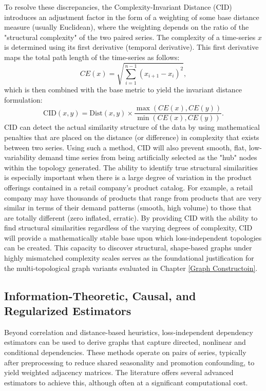 To resolve these discrepancies, the Complexity-Invariant Distance (CID) \cite{batista_cid_2014} introduces an adjustment factor in the form of a weighting of some base distance measure (usually Euclidean), where the weighting depends on the ratio of the "structural complexity" of the two paired series. The complexity of a time-series \( x \) is determined using its first derivative (temporal derivative). This first derivative maps the total path length of the time-series as follows:
\begin{equation}
    CE(x) = \sqrt{\sum_{i=1}^{n-1} (x_{i+1} - x_i)^2},
\end{equation}
which is then combined with the base metric to yield the invariant distance formulation:
\begin{equation}
    \text{CID}(x, y) = \text{Dist}(x, y) \times \frac{\max(CE(x), CE(y))}{\min(CE(x), CE(y))}.
\end{equation}
CID can detect the actual similarity structure of the data by using mathematical penalties that are placed on the distance (or difference) in complexity that exists between two series. Using such a method, CID will also prevent smooth, flat, low-variability demand time series from being artificially selected as the "hub" nodes within the topology generated. The ability to identify true structural similarities is especially important when there is a large degree of variation in the product offerings contained in a retail company's product catalog. For example, a retail company may have thousands of products that range from products that are very similar in terms of their demand patterns (smooth, high volume) to those that are totally different (zero inflated, erratic). By providing CID with the ability to find structural similarities regardless of the varying degrees of complexity, CID will provide a mathematically stable base upon which loss-independent topologies can be created. This capacity to discover structural, shape-based graphs under highly mismatched complexity scales serves as the foundational justification for the multi-topological graph variants evaluated in Chapter \ref{Graph Constructoin}.
\subsection{Information-Theoretic, Causal, and Regularized Estimators}
\label{subsec:info_causal_regularized_estimators}

Beyond correlation and distance-based heuristics, loss-independent dependency estimators can be used to derive graphs that capture directed, nonlinear and conditional dependencies. These methods operate on pairs of series, typically after preprocessing to reduce shared seasonality and promotion confounding, to yield weighted adjacency matrices. The literature offers several advanced estimators to achieve this, although often at a significant computational cost.

